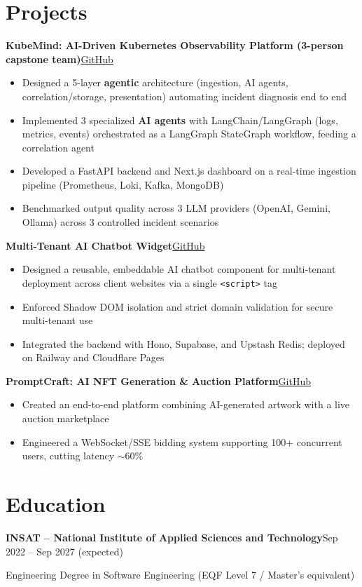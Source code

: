 \documentclass[10pt,a4paper]{article}
\newcommand{\entry}[2]{\vspace{1pt}\noindent\textbf{#1}\hfill{\color{muted}#2}\par}
\newcommand{\gh}[1]{\href{https://github.com/Hsan003/#1}{GitHub}}
\begin{document}
\section{Projects}
\entry{KubeMind: AI-Driven Kubernetes Observability Platform (3-person capstone team)}{\gh{kubemind}}
\begin{itemize}
  \item Designed a 5-layer \textbf{agentic} architecture (ingestion, AI agents, correlation/storage, presentation) automating incident diagnosis end to end
  \item Implemented 3 specialized \textbf{AI agents} with LangChain/LangGraph (logs, metrics, events) orchestrated as a LangGraph StateGraph workflow, feeding a correlation agent
  \item Developed a FastAPI backend and Next.js dashboard on a real-time ingestion pipeline (Prometheus, Loki, Kafka, MongoDB)
  \item Benchmarked output quality across 3 LLM providers (OpenAI, Gemini, Ollama) across 3 controlled incident scenarios
\end{itemize}
\entry{Multi-Tenant AI Chatbot Widget}{\gh{AI-Assistant-Backend}}
\begin{itemize}
  \item Designed a reusable, embeddable AI chatbot component for multi-tenant deployment across client websites via a single \texttt{<script>} tag
  \item Enforced Shadow DOM isolation and strict domain validation for secure multi-tenant use
  \item Integrated the backend with Hono, Supabase, and Upstash Redis; deployed on Railway and Cloudflare Pages
\end{itemize}
\entry{PromptCraft: AI NFT Generation \& Auction Platform}{\gh{prompt-craft-back}}
\begin{itemize}
  \item Created an end-to-end platform combining AI-generated artwork with a live auction marketplace
  \item Engineered a WebSocket/SSE bidding system supporting 100+ concurrent users, cutting latency $\sim$60\%
\end{itemize}

\section{Education}
\entry{INSAT -- National Institute of Applied Sciences and Technology}{Sep 2022 -- Sep 2027 (expected)}
Engineering Degree in Software Engineering (EQF Level 7 / Master's equivalent)
\end{document}
